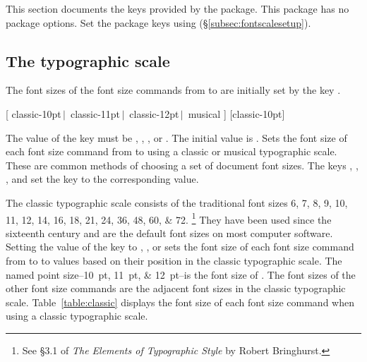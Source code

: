 \documentclass{beery}
\begin{document}
This section documents the keys provided by the  package.
This package has no package options.
Set the package keys using  (\S\ref{subsec:fontscalesetup}).

\subsection{The typographic scale}
\label{subsec:typographicscale}

The font sizes of the font size commands from  to  are initially set by the key .

  [%
    classic-10pt$\,\vert\,$\allowbreak
    classic-11pt$\,\vert\,$\allowbreak
    classic-12pt$\,\vert\,$\allowbreak\hspace*{1.5em}%
    musical%
  ]
  [classic-10pt]
\newline
{}
\newline
{}
\newline
{}
\nopagebreak\newline
{}

The value of the key  must be , , , or .
The initial value is .
Sets the font size of each font size command from  to  using a classic or musical typographic scale.
These are common methods of choosing a set of document font sizes.
The keys , , , and  set the key  to the corresponding value.



The classic typographic scale consists of the traditional font sizes
\numlist{6;7;8;9;10;11;12;14;16;18;21;24;36;48;60;72}.%
\footnote{See \S3.1 of \textit{The Elements of Typographic Style} by Robert Bringhurst.}
They have been used since the sixteenth century and are the default font sizes on most computer software.
Setting the value of the key  to , , or  sets the font size of each font size command from  to  to values based on their position in the classic typographic scale.
The named point size\---\qtylist[list-final-separator={, or }]{10;11;12}{pt}\---is the font size of .
The font sizes of the other font size commands are the adjacent font sizes in the classic typographic scale.
Table~\ref{table:classic} displays the font size of each font size command when using a classic typographic scale.
\end{document}
